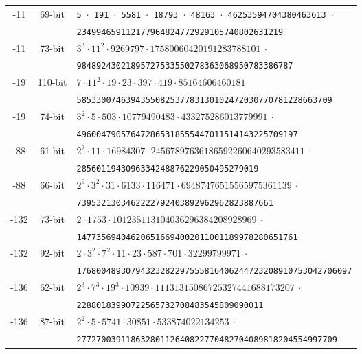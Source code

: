 \documentclass{amsart}
\begin{document}
\begin{table*}[ht]
\begin{tabularx}{\textwidth}{ccl}
        -11  &  69-bit & \tt 5 $\cdot$ 191 $\cdot$ 5581 $\cdot$ 18793 $\cdot$ 48163 $\cdot$ 46253594704380463613 $\cdot$  \\
         			&   & \tt  234994659112177964824772929105740802631219  \\    			
        -11  &  73-bit & \tt $3^3 \cdot 11^2 \cdot 9269797 \cdot 17580060420191283788101 ~\cdot$  \\
         			&   & \tt  98489243021895727533550278363068950783386787  \\   
        -19  &  110-bit & \tt $ 7 \cdot11^2  \cdot 19  \cdot 23  \cdot 397  \cdot 419 \cdot 85164606460181$  \\
         			&   & \tt 5853300746394355082537783130102472030770781228663709  \\   
        -19  &  74-bit & \tt $ 3^2 \cdot 5 \cdot 503 \cdot 10779490483 \cdot 433275286013779991 ~\cdot$  \\
         			&   & \tt 496004790576472865318555447011514143225709197 \\   
        -88  &  61-bit & \tt $ 2^2 \cdot 11 \cdot 16984307 \cdot 24567897636186592260640293583411~\cdot$  \\
         			&   & \tt 2856011943096334248876229050495279019 \\   
        -88  &  66-bit & \tt $ 2^9 \cdot 3^2 \cdot 31 \cdot 6133 \cdot 116471 \cdot 69487476515565975361139~\cdot$  \\
         			&   & \tt 7395321303462222792403892962962823887661 \\   
        -132 &  73-bit & \tt $  2 \cdot 1753 \cdot 101235113104036296384208928969~\cdot$  \\
         			&   & \tt  147735694046206516694002011001189978280651761\\   			
        -132 &  92-bit & \tt $ 2 \cdot 3^2 \cdot 7^2 \cdot 11 \cdot 23 \cdot 587 \cdot 701 \cdot 32299799971~\cdot$  \\
         			&   & \tt  17680048930794323282297555816406244723208910753042706097\\   	
        -136 &  62-bit & \tt $  2^3 \cdot 7^3 \cdot 19^3 \cdot 10939 \cdot 11131315086725327441688173207 ~\cdot$  \\
         			&   & \tt  22880183990722565732708483545809090011\\  
        -136 &  87-bit & \tt $  2^2 \cdot 5 \cdot 5741 \cdot 30851 \cdot 533874022134253  ~\cdot$  \\
         			&   & \tt   27727003911863280112640822770482704089818204554997709\\  

\end{tabularx}
\end{table*}
\end{document}
